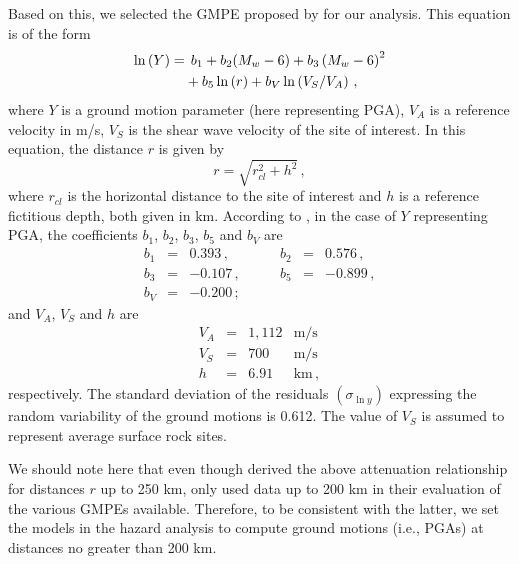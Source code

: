 Based on this, we selected the GMPE proposed by \citet{Kalkan2004} for our analysis. This equation is of the form
%
\begin{align}
	\ln \left( Y \right) =
		& \hspace{1ex} b_1 + b_2(M_w - 6) + b_3 \left( M_w - 6 \right)^{2} \nonumber \\
		& + b_5 \ln \left( r \right) + b_V \ln \left( V_S / V_A \right)
	\, ,
\end{align}
%
where $Y$ is a ground motion parameter (here representing PGA), $V_A$ is a reference velocity in m/s,  $V_S$ is the shear wave velocity of the site of interest. In this equation, the distance $r$ is given by
%
\begin{equation}
	r= \sqrt{ r^2_{\mathit{cl}} + h^2 }
	\, ,
\end{equation}
%
where $r_{\mathit{cl}}$ is the horizontal distance to the site of interest and $h$ is a reference fictitious depth, both given in km. According to \citet{Kalkan2004}, in the case of $Y$ representing PGA, the coefficients $b_1$, $b_2$, $b_3$, $b_5$ and $b_V$ are
%
\begin{equation}
\begin{array}{lcrlcr}
	b_1 &=&  0.393   \,,&\hspace{2em}   b_2 &=& 0.576\,,   \\
	b_3 &=& -0.107   \,,&\hspace{2em}   b_5 &=& -0.899\,,  \\
	b_V &=& -0.200   \,;
	\nonumber
\end{array}
\end{equation}
%
and $V_A$, $V_S$ and $h$ are
%
\begin{equation}
\begin{array}{lcrl}
	V_A &=& 1,112 & \mathrm{m/s}	\\
	V_S &=&   700 & \mathrm{m/s}	\\
	h   &=&  6.91 & \mathrm{km}\,,
	\nonumber
\end{array}
\end{equation}
%
respectively. The standard deviation of the residuals $(\sigma_{\ln y})$ expressing the random variability of the ground motions is 0.612. The value of $V_S$ is assumed to represent average surface rock sites.

We should note here that even though \citet{Kalkan2004} derived the above attenuation relationship for distances $r$ up to 250 km, \citet{Zafarani2014} only used data up to 200 km in their evaluation of the various GMPEs available. Therefore, to be consistent with the latter, we set the models in the hazard analysis to compute ground motions (i.e., PGAs) at distances no greater than 200 km.
